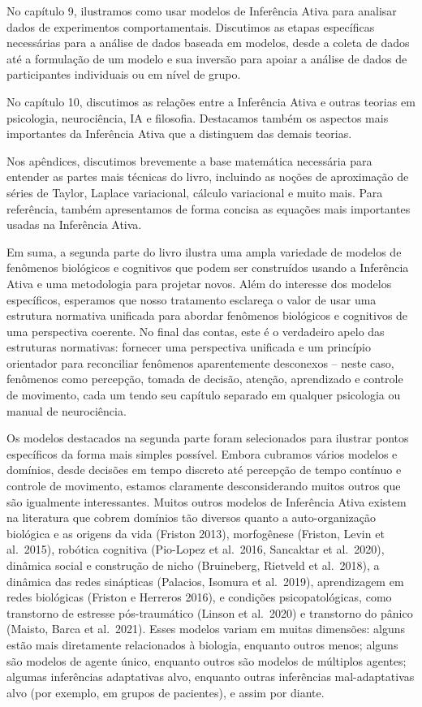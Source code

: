 \documentclass[
  12pt,
]{book}
\begin{document}
No capítulo 9, ilustramos como usar modelos de Inferência Ativa para analisar dados de experimentos comportamentais. Discutimos as etapas específicas necessárias para a análise de dados baseada em modelos, desde a coleta de dados até a formulação de um modelo e sua inversão para apoiar a análise de dados de participantes individuais ou em nível de grupo.

No capítulo 10, discutimos as relações entre a Inferência Ativa e outras teorias em psicologia, neurociência, IA e filosofia. Destacamos também os aspectos mais importantes da Inferência Ativa que a distinguem das demais teorias.

Nos apêndices, discutimos brevemente a base matemática necessária para entender as partes mais técnicas do livro, incluindo as noções de aproximação de séries de Taylor, Laplace variacional, cálculo variacional e muito mais. Para referência, também apresentamos de forma concisa as equações mais importantes usadas na Inferência Ativa.

Em suma, a segunda parte do livro ilustra uma ampla variedade de modelos de fenômenos biológicos e cognitivos que podem ser construídos usando a Inferência Ativa e uma metodologia para projetar novos. Além do interesse dos modelos específicos, esperamos que nosso tratamento esclareça o valor de usar uma estrutura normativa unificada para abordar fenômenos biológicos e cognitivos de uma perspectiva coerente. No final das contas, este é o verdadeiro apelo das estruturas normativas: fornecer uma perspectiva unificada e um princípio orientador para reconciliar fenômenos aparentemente desconexos -- neste caso, fenômenos como percepção, tomada de decisão, atenção, aprendizado e controle de movimento, cada um tendo seu capítulo separado em qualquer psicologia ou manual de neurociência.

Os modelos destacados na segunda parte foram selecionados para ilustrar pontos específicos da forma mais simples possível. Embora cubramos vários modelos e domínios, desde decisões em tempo discreto até percepção de tempo contínuo e controle de movimento, estamos claramente desconsiderando muitos outros que são igualmente interessantes. Muitos outros modelos de Inferência Ativa existem na literatura que cobrem domínios tão diversos quanto a auto-organização biológica e as origens da vida (Friston 2013), morfogênese (Friston, Levin et al.~2015), robótica cognitiva (Pio-Lopez et al.~2016, Sancaktar et al.~2020), dinâmica social e construção de nicho (Bruineberg, Rietveld et al.~2018), a dinâmica das redes sinápticas (Palacios, Isomura et al.~2019), aprendizagem em redes biológicas (Friston e Herreros 2016), e condições psicopatológicas, como transtorno de estresse pós-traumático (Linson et al.~2020) e transtorno do pânico (Maisto, Barca et al.~2021). Esses modelos variam em muitas dimensões: alguns estão mais diretamente relacionados à biologia, enquanto outros menos; alguns são modelos de agente único, enquanto outros são modelos de múltiplos agentes; algumas inferências adaptativas alvo, enquanto outras inferências mal-adaptativas alvo (por exemplo, em grupos de pacientes), e assim por diante.
\end{document}
